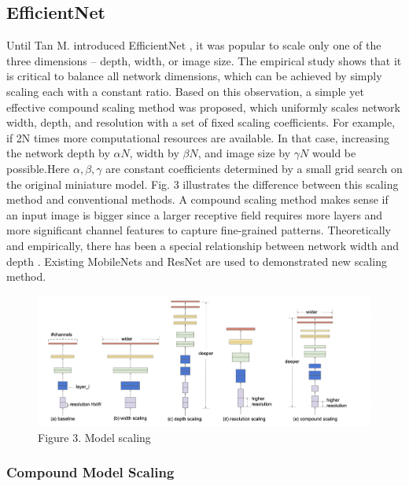 \documentclass[
]{krantz}
\begin{document}
\hypertarget{efficientnet}{%
\subsection{EfficientNet}\label{efficientnet}}

Until Tan M. introduced EfficientNet \citet{effecient}, it was popular to scale only one of the three dimensions -- depth, width, or image size. The empirical study shows that it is critical to balance all network dimensions, which can be achieved by simply scaling each with a constant ratio. Based on this observation, a simple yet effective compound scaling method was proposed, which uniformly scales network width, depth, and resolution with a set of fixed scaling coefficients.
For example, if 2N times more computational resources are available. In that case, increasing the network depth by \(\alpha N\), width by \(\beta N\), and image size by \(\gamma N\) would be possible.Here \(\alpha,\beta,\gamma\) are constant coefficients determined by a small grid search on the original miniature model. Fig. 3 illustrates the difference between this scaling method and conventional methods.
A compound scaling method makes sense if an input image is bigger since a larger receptive field requires more layers and more significant channel features to capture fine-grained patterns. Theoretically and empirically, there has been a special relationship between network width and depth \citet{depthwidth}. Existing MobileNets \citet{mobilenet} and ResNet are used to demonstrated new scaling method.

\begin{figure}

{\centering \includegraphics[width=1\linewidth]{./figures/01-chapter1/Model_scaling} 

}

\caption{Figure 3. Model scaling}\label{fig:ch01-figure03}
\end{figure}

\hypertarget{compound-model-scaling}{%
\subsubsection{Compound Model Scaling}\label{compound-model-scaling}}
\end{document}
